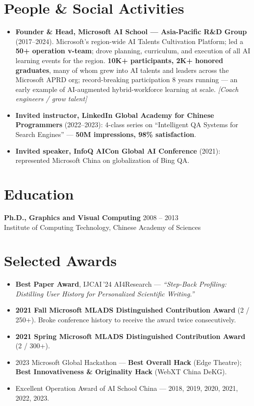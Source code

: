\documentclass[10.5pt,letterpaper]{article}
\newcommand{\lp}[1]{\textcolor{blue!55!black}{\small\textit{[#1]}}}
\begin{document}
\section*{People \& Social Activities}
\begin{itemize}
  \item \textbf{Founder \& Head, Microsoft AI School --- Asia-Pacific R\&D Group} (2017--2024). Microsoft's region-wide AI Talents Cultivation Platform; led a \textbf{50+ operation v-team}; drove planning, curriculum, and execution of all AI learning events for the region. \textbf{10K+ participants, 2K+ honored graduates}, many of whom grew into AI talents and leaders across the Microsoft APRD org; record-breaking participation 8 years running --- an early example of AI-augmented hybrid-workforce learning at scale. \lp{Coach engineers / grow talent}
  \item \textbf{Invited instructor, LinkedIn Global Academy for Chinese Programmers} (2022--2023): 4-class series on ``Intelligent QA Systems for Search Engines'' --- \textbf{50M impressions, 98\% satisfaction}.
  \item \textbf{Invited speaker, InfoQ AICon Global AI Conference} (2021): represented Microsoft China on globalization of Bing QA.
\end{itemize}

\section*{Education}
\noindent\textbf{Ph.D., Graphics and Visual Computing} \hfill 2008 -- 2013\\
Institute of Computing Technology, Chinese Academy of Sciences

\section*{Selected Awards}
\begin{itemize}
  \item \textbf{Best Paper Award}, IJCAI\,'24 AI4Research --- \textit{``Step-Back Profiling: Distilling User History for Personalized Scientific Writing.''}
  \item \textbf{2021 Fall Microsoft MLADS Distinguished Contribution Award} (2 / 250+). Broke conference history to receive the award twice consecutively.
  \item \textbf{2021 Spring Microsoft MLADS Distinguished Contribution Award} (2 / 300+).
  \item 2023 Microsoft Global Hackathon --- \textbf{Best Overall Hack} (Edge Theatre); \textbf{Best Innovativeness \& Originality Hack} (WebXT China DeKG).
  \item Excellent Operation Award of AI School China --- 2018, 2019, 2020, 2021, 2022, 2023.
\end{itemize}
\end{document}
